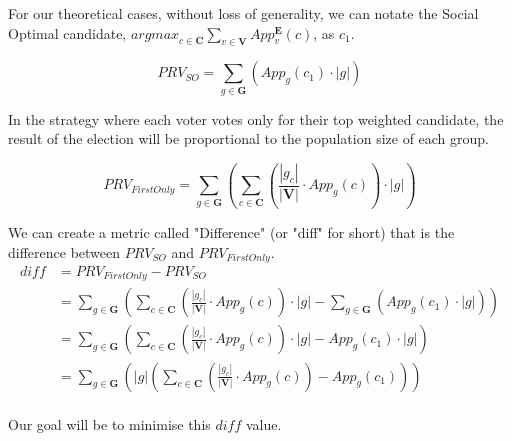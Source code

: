 \documentclass{article}
\begin{document}
For our theoretical cases, without loss of generality, we can notate the Social Optimal candidate, ${argmax}_{c \in \boldsymbol{C}} \sum^{}_{v \in \boldsymbol{V}}{App^{\boldsymbol{E}}_{v}(c)}$, as $c_1$.

\begin{equation}
     PRV_{SO} = \sum^{}_{g \in \boldsymbol{G}}{\left(App_g(c_1)\cdot|g|\right)} 
\end{equation}

In the strategy where each voter votes only for their top weighted candidate, the result of the election will be proportional to the population size of each group.

\begin{equation}
     PRV_{FirstOnly} = \sum^{}_{g \in \boldsymbol{G}}{\left(\sum^{}_{c \in \boldsymbol{C}}{\left(\frac{|g_c|}{|\boldsymbol{V}|} \cdot App_g(c)\right)} \cdot |g|\right)} 
\end{equation} 

We can create a metric called "Difference" (or "diff" for short) that is the difference between $PRV_{SO}$ and $PRV_{FirstOnly}$.
\begin{equation}
\begin{aligned}
{diff} &= PRV_{FirstOnly} - PRV_{SO}\\
&= \sum^{}_{g \in \boldsymbol{G}}{\left(\sum^{}_{c \in \boldsymbol{C}}{\left(\frac{|g_c|}{|\boldsymbol{V}|} \cdot App_g(c)\right)} \cdot |g| - \sum^{}_{g \in \boldsymbol{G}}{\left(App_g(c_1)\cdot|g|\right)}\right)}\\
&= \sum^{}_{g \in \boldsymbol{G}}{\left(\sum^{}_{c \in \boldsymbol{C}}{\left(\frac{|g_c|}{|\boldsymbol{V}|} \cdot App_g(c)\right)} \cdot |g| - App_g(c_1)\cdot|g|\right)}\\
&= \sum^{}_{g \in \boldsymbol{G}}{\left(|g|\left(\sum^{}_{c \in \boldsymbol{C}}{\left(\frac{|g_c|}{|\boldsymbol{V}|} \cdot App_g(c)\right)} - App_g(c_1)\right)\right)}
\end{aligned}
\end{equation}\\

Our goal will be to minimise this $diff$ value.
\end{document}
